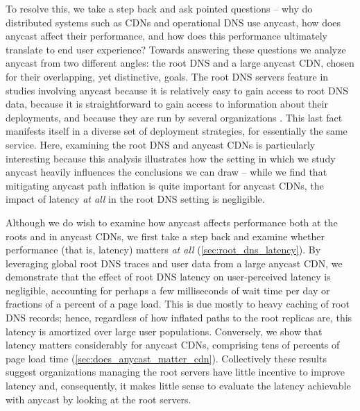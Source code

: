 \documentclass[sigconf,letterpaper,nonacm,10pt]{acmart}
\begin{document}
To resolve this, we take a step back and ask pointed questions -- why do
distributed systems such as CDNs and operational DNS use anycast, how
does anycast affect their performance, and how does this performance
ultimately translate to end user experience? Towards answering these
questions we analyze anycast from two different angles: the root DNS and
a large anycast CDN, chosen for their overlapping, yet distinctive,
goals. The root DNS servers feature in studies
\cite{colitti2006evaluating, moura2016anycast, de2017anycast, li_levin_spring_bhattacharjee_2018, mcquistin2019taming}
involving anycast because it is relatively easy to gain access to root
DNS data, because it is straightforward to gain access to information
about their deployments, and because they are run by several
organizations \cite{root_servers}. This last fact manifests itself in a
diverse set of deployment strategies, for essentially the same service.
Here, examining the root DNS and anycast CDNs is particularly
interesting because this analysis illustrates how the setting in which
we study anycast heavily influences the conclusions we can draw -- while
we find that mitigating anycast path inflation is quite important for
anycast CDNs, the impact of latency \textit{at all} in the root DNS
setting is negligible.

Although we do wish to examine how anycast affects performance both at
the roots and in anycast CDNs, we first take a step back and examine
whether performance (that is, latency) matters \textit{at all}
(\autoref{sec:root_dns_latency}). By leveraging global root DNS traces
and user data from a large anycast CDN, we demonstrate that the effect
of root DNS latency on user-perceived latency is negligible, accounting
for perhaps a few milliseconds of wait time per day or fractions of a
percent of a page load. This is due mostly to heavy caching of root DNS
records; hence, regardless of how inflated paths to the root replicas
are, this latency is amortized over large user populations. Conversely,
we show that latency matters considerably for anycast CDNs, comprising
tens of percents of page load time
(\autoref{sec:does_anycast_matter_cdn}). Collectively these results
suggest organizations managing the root servers have little incentive to
improve latency and, consequently, it makes little sense to evaluate the
latency achievable with anycast by looking at the root servers.
\end{document}
